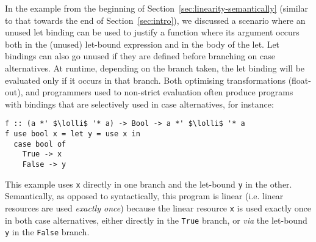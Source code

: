 \documentclass[acmsmall,review,anonymous]{acmart}
\newcommand{\lolli}{\multimap}
\begin{document}
In the example from the beginning of
Section~\ref{sec:linearity-semantically} (similar to that towards the end
of Section~\ref{sec:intro}), we discussed a scenario where an
unused let binding can be used to justify a function where its
argument occurs both in the (unused) let-bound expression and in the
body of the let.
Let bindings can also go unused if they are defined before branching on case
alternatives. At runtime, depending on the branch taken, the let binding will
be evaluated only if it occurs in that branch.
Both optimising transformations (float-out), and programmers used to
non-strict evaluation often produce
programs with bindings that are selectively used in case alternatives, for
instance:
%
\begin{notyet}
\begin{lstlisting}
f :: (a *' $\lolli$ '* a) -> Bool -> a *' $\lolli$ '* a
f use bool x = let y = use x in
  case bool of
    True -> x 
    False -> y
\end{lstlisting}
\end{notyet}
%
This example uses \lstinline{x} directly in one branch and the let-bound
\lstinline{y} in the other. Semantically, as opposed to syntactically, this
program is linear (i.e. linear resources are used \emph{exactly once}) because
the linear resource \lstinline{x} is used exactly once in both case
alternatives, either directly in the \lstinline{True} branch, or \emph{via} the
let-bound \lstinline{y} in the \lstinline{False} branch.
\end{document}
